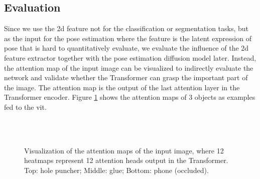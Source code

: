 \documentclass[12pt,DIV14,BCOR12mm,a4paper,footinclude=false,headinclude,parskip=half-,twoside,openright,cleardoublepage=empty,toc=index,bibliography=totoc,listof=totoc]{scrreprt}
\numberwithin{equation}{chapter}
\begin{document}
\subsection{Evaluation}
Since we use the \gls{2d} feature not for the classification or segmentation tasks, but as the input for the pose estimation where the feature is the latent expression of pose that is hard to quantitatively evaluate, we evaluate the influence of the \gls{2d} feature extractor together with the pose estimation diffusion model later. Instead, the attention map of the input image can be visualized to indirectly evaluate the network and validate whether the Transformer can grasp the important part of the image. The attention map is the output of the last attention layer in the Transformer encoder. Figure \ref{img:atten} shows the attention maps of 3 objects as examples fed to the \gls{vit}.

\begin{figure}[h]
  \centering
   \\
  \centering
   \\
  \centering
  \caption{Visualization of the attention maps of the input image, where 12 heatmaps represent 12 attention heads output in the Transformer. Top: hole puncher; Middle: glue; Bottom: phone (occluded).}
  \label{img:atten}
\end{figure}
\end{document}
